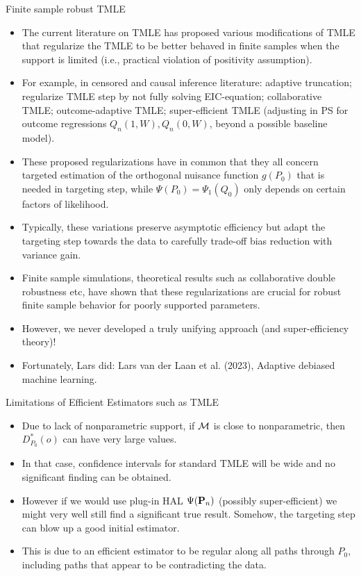 \documentclass[t]{beamer}
\begin{document}
\begin{frame}{Finite sample robust TMLE}
\begin{itemize}
\item The current literature on TMLE has proposed various modifications of TMLE that regularize the TMLE to be better behaved in finite samples when the support is limited (i.e., practical violation of positivity assumption).
\item For example, in censored and causal inference literature: adaptive truncation; regularize TMLE step by not fully solving EIC-equation; collaborative TMLE; outcome-adaptive TMLE; super-efficient TMLE (adjusting in PS for outcome regressions $Q_n(1,W),Q_n(0,W)$, beyond a possible baseline model).
\item These proposed regularizations have in common that they all concern targeted estimation of the orthogonal nuisance function $g(P_0)$ that is needed in targeting step, while $\Psi(P_0)=\Psi_1(Q_0)$ only depends on certain factors of likelihood.
\end{itemize}
\end{frame}

\begin{frame}
\begin{itemize}
\item Typically, these variations preserve asymptotic efficiency but adapt the targeting step towards the data to carefully trade-off bias reduction with variance gain.
\item Finite sample simulations, theoretical results such as collaborative double robustness etc, have shown that these regularizations are crucial for robust finite sample behavior for poorly supported parameters.
\item However, we never developed a truly unifying approach (and super-efficiency theory)!
\item Fortunately, Lars did: Lars van der Laan et al. (2023), Adaptive debiased machine learning.
\end{itemize}
\end{frame}

\begin{frame}{Limitations of Efficient Estimators such as TMLE}
\begin{itemize}
\item Due to lack of nonparametric support, if ${\cal M}$ is close to nonparametric, then
$D^*_{P_0}(o)$ can have very large values.
\item In that case, confidence intervals for standard TMLE will be wide and no significant finding can be obtained.
\item However if we would use plug-in HAL $\Psi({\bf P}_n)$ (possibly super-efficient) we might very well still find a significant true result. Somehow, the targeting step can blow up a good initial estimator.
\item This is due to an efficient estimator to be regular along all paths through $P_0$, including paths that appear to be contradicting the data.
\end{itemize}
\end{frame}
\end{document}
